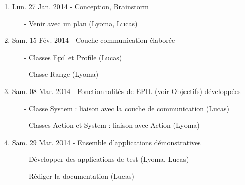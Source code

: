 \documentclass[12pt,a4paper]{article}
\begin{document}
\begin{enumerate}
\item Lun. 27 Jan. 2014 - Conception, Brainstorm
\begin{itemize}
\item[-] Venir avec un plan (Lyoma, Lucas)
\end{itemize}
\item Sam. 15 F\'{e}v. 2014 - Couche communication \'{e}labor\'{e}e
\begin{itemize}
\item[-] Classes Epil et Profile (Lucas)
\item[-] Classe Range (Lyoma)
\end{itemize}
\item Sam. 08 Mar. 2014 - Fonctionnalit\'{e}s de EPIL (voir Objectifs) d\'{e}velopp\'{e}es
\begin{itemize}
\item[-] Classe System : liaison avec la couche de communication (Lucas)
\item[-] Classes Action et System : liaison avec Action  (Lyoma)
\end{itemize}
\item Sam. 29 Mar. 2014 - Ensemble d'applications d\'{e}monstratives
\begin{itemize}
\item[-] D\'{e}velopper des applications de test (Lyoma, Lucas)
\item[-] R\'{e}diger la documentation (Lucas)
\end{itemize}
\end{enumerate}
\end{document}
